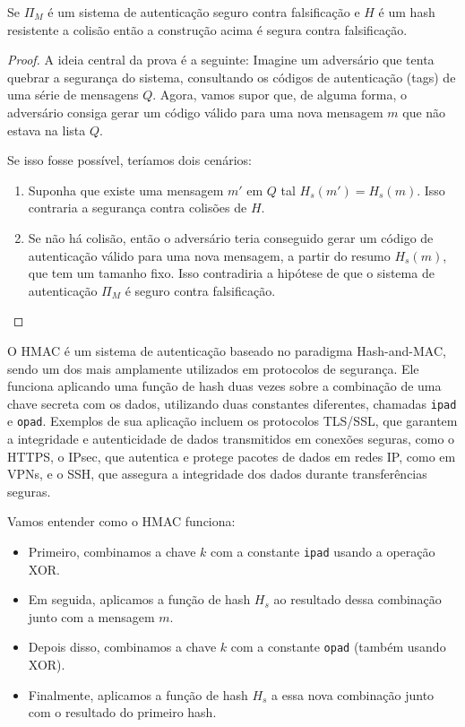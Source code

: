 \begin{theorem}
  Se $\Pi_M$ é um sistema de autenticação seguro contra falsificação e $H$ é um hash resistente a colisão então a construção acima é segura contra falsificação.
\end{theorem}
\begin{proof}
A ideia central da prova é a seguinte: 
Imagine um adversário que tenta quebrar a segurança do sistema, consultando os códigos de autenticação (tags) de uma série de mensagens $Q$.
Agora, vamos supor que, de alguma forma, o adversário consiga gerar um código válido para uma nova mensagem $m$ que não estava na lista $Q$.

Se isso fosse possível, teríamos dois cenários:
\begin{enumerate}
\item Suponha que existe uma mensagem $m'$ em $Q$ tal $H_s(m') = H_s(m)$.
  Isso contraria a segurança contra colisões de $H$.
\item Se não há colisão, então o adversário teria conseguido gerar um código de autenticação válido para uma nova mensagem, a partir do resumo $H_s(m)$, que tem um tamanho fixo.
  Isso contradiria a hipótese de que o sistema de autenticação $\Pi_M$  é seguro contra falsificação.
\end{enumerate}

\end{proof}

O HMAC é um sistema de autenticação baseado no paradigma Hash-and-MAC, sendo um dos mais amplamente utilizados em protocolos de segurança.
Ele funciona aplicando uma função de hash duas vezes sobre a combinação de uma chave secreta com os dados, utilizando duas constantes diferentes, chamadas {\tt ipad} e {\tt opad}.
Exemplos de sua aplicação incluem os protocolos TLS/SSL, que garantem a integridade e autenticidade de dados transmitidos em conexões seguras, como o HTTPS, o IPsec, que autentica e protege pacotes de dados em redes IP, como em VPNs, e o SSH, que assegura a integridade dos dados durante transferências seguras.

Vamos entender como o HMAC funciona:

\begin{itemize}
\item Primeiro, combinamos a chave $k$ com a constante {\tt ipad} usando a operação XOR.
\item Em seguida, aplicamos a função de hash $H_s$ ao resultado dessa combinação junto com a mensagem $m$.
\item Depois disso, combinamos a chave $k$ com a constante {\tt opad} (também usando XOR).
\item Finalmente, aplicamos a função de hash $H_s$ a essa nova combinação junto com o resultado do primeiro hash.
\end{itemize}

